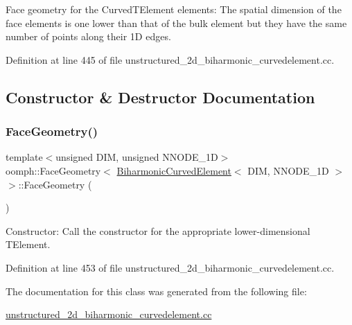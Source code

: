 Face geometry for the Curved\+T\+Element elements\+: The spatial dimension of the face elements is one lower than that of the bulk element but they have the same number of points along their 1D edges. 

Definition at line 445 of file unstructured\+\_\+2d\+\_\+biharmonic\+\_\+curvedelement.\+cc.



\subsection{Constructor \& Destructor Documentation}
\mbox{\label{classoomph_1_1FaceGeometry_3_01BiharmonicCurvedElement_3_01DIM_00_01NNODE__1D_01_4_01_4_a9b53ebab89d9c273519b2cd4b338a898}} 
\subsubsection{\texorpdfstring{Face\+Geometry()}{FaceGeometry()}}
{\footnotesize\ttfamily template$<$unsigned D\+IM, unsigned N\+N\+O\+D\+E\+\_\+1D$>$ \\
oomph\+::\+Face\+Geometry$<$ \hyperlink{classoomph_1_1BiharmonicCurvedElement}{Biharmonic\+Curved\+Element}$<$ D\+IM, N\+N\+O\+D\+E\+\_\+1D $>$ $>$\+::Face\+Geometry (\begin{DoxyParamCaption}{ }\end{DoxyParamCaption})\hspace{0.3cm}{\ttfamily [inline]}}



Constructor\+: Call the constructor for the appropriate lower-\/dimensional T\+Element. 



Definition at line 453 of file unstructured\+\_\+2d\+\_\+biharmonic\+\_\+curvedelement.\+cc.



The documentation for this class was generated from the following file\+:\begin{DoxyCompactItemize}
\item 
\hyperlink{unstructured__2d__biharmonic__curvedelement_8cc}{unstructured\+\_\+2d\+\_\+biharmonic\+\_\+curvedelement.\+cc}\end{DoxyCompactItemize}
